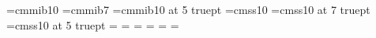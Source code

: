 \makeatletter
\def\@part[#1]#2{%
    \ifnum \c@secnumdepth >-2\relax
      \refstepcounter{part}%
      \addcontentsline{toc}{part}{\partname~\thepart\hspace{1em}#1}%
    \else
      \addcontentsline{toc}{part}{#1}%
    \fi
    \markboth{}{}%
    {\centering
     \interlinepenalty \@M
     \normalfont
     \ifnum \c@secnumdepth >-2\relax
       \huge\bfseries \partname\nobreakspace\thepart
       \par
       \vskip 20\p@
     \fi
     \Huge \bfseries #2\par}%
    \@endpart}
\makeatother



    
\renewcommand\footnoterule{\textcolor{unibo}{\kern-3pt \hrule width 2in \kern 2.6pt}}


\renewcommand\thefootnote{\textcolor{unibo}{\arabic{footnote}}}

\usepackage{tocloft}
\renewcommand{\cftdot}{\textcolor{unibo}{.}}
\renewcommand{\cftchapaftersnum}{~\textcolor{unibo}{|}~}


\font\grassettogreco=cmmib10
\font\scriptgrassettogreco=cmmib7
\font\scriptscriptgrassettogreco=cmmib10 at 5 truept
\font\sansserif=cmss10
\font\scriptsansserif=cmss10 at 7 truept
\font\scriptscriptsansserif=cmss10 at 5 truept
=\grassettogreco
{}=\scriptgrassettogreco
{}=\scriptscriptgrassettogreco
\def\bgr{\fam=13}
=\sansserif
{}=\scriptsansserif
{}=\scriptscriptsansserif
\def\ssm{\fam=14}


